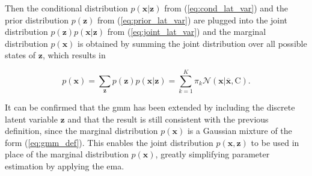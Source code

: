 %     
%     

Then the conditional distribution $p(\bm{x}|\bm{z})$ from (\ref{eq:cond_lat_var}) and the prior distribution $p(\bm{z})$ from (\ref{eq:prior_lat_var}) are plugged into the joint distribution $p(\bm{z})p(\bm{x}|\bm{z})$ from (\ref{eq:joint_lat_var}) and the marginal distribution $p(\bm{x})$ is obtained by summing the joint distribution over all possible states of $\bm{z}$, which results in 

\begin{equation}\label{eq:joint_marg_lat_var}
    p(\bm{x}) = \sum\limits_{\bm{z}}p(\bm{z})p(\bm{x}|\bm{z}) = \sum\limits_{k=1}^K\pi_k\mathcal{N}(\bm{x} | \overline{\bm{x}}, \bm{\mathrm{C}}).
\end{equation}

It can be confirmed that the \acrshort{gmm} has been extended by including the discrete latent variable  $\bm{z}$ and that the result is still consistent with the previous definition, since the marginal distribution $p(\bm{x})$ is a Gaussian mixture of the form (\ref{eq:gmm_def}). This enables the joint distribution $p(\bm{x}, \bm{z})$ to be used in place of the marginal distribution $p(\bm{x})$, greatly simplifying parameter estimation by applying the \acrshort{ema}.

